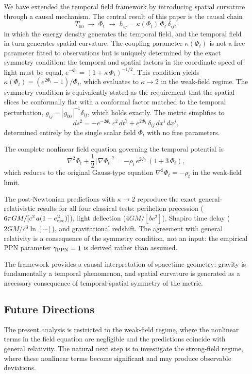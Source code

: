 \documentclass[12pt]{article}
\begin{document}
We have extended the temporal field framework by introducing spatial curvature through a causal mechanism. The central result of this paper is the causal chain
$$
T_{00} \;\longrightarrow\; \Phi_t \;\longrightarrow\; h_{ij} = \kappa(\Phi_t)\,\Phi_t\,\delta_{ij},
$$
in which the energy density generates the temporal field, and the temporal field in turn generates spatial curvature. The coupling parameter $\kappa(\Phi_t)$ is not a free parameter fitted to observations but is uniquely determined by the exact symmetry condition: the temporal and spatial factors in the coordinate speed of light must be equal, $e^{-\Phi_t} = (1+\kappa\,\Phi_t)^{-1/2}$. This condition yields $\kappa(\Phi_t) = (e^{2\Phi_t}-1)/\Phi_t$, which evaluates to $\kappa \to 2$ in the weak-field regime. The symmetry condition is equivalently stated as the requirement that the spatial slices be conformally flat with a conformal factor matched to the temporal perturbation, $g_{ij} = |g_{00}|^{-1}\delta_{ij}$, which holds exactly. The metric simplifies to
$$
ds^2 = -e^{-2\Phi_t}\,c^2\,dt^2 + e^{2\Phi_t}\,\delta_{ij}\,dx^i\,dx^j,
$$
determined entirely by the single scalar field $\Phi_t$ with no free parameters.

The complete nonlinear field equation governing the temporal potential is
$$
\nabla^2\Phi_t + \frac{1}{2}\,|\nabla\Phi_t|^2 = -\rho_t\,e^{2\Phi_t}\,(1 + 3\,\Phi_t),
$$
which reduces to the original Gauss-type equation $\nabla^2\Phi_t = -\rho_t$ in the weak-field limit.

The post-Newtonian predictions with $\kappa \to 2$ reproduce the exact general-relativistic results for all four classical tests: perihelion precession ($6\pi GM/[c^2\,a(1-e_{\rm ecc}^2)]$), light deflection ($4GM/[bc^2]$), Shapiro time delay ($2GM/c^3\ln[\cdots]$), and gravitational redshift. The agreement with general relativity is a consequence of the symmetry condition, not an input: the empirical PPN parameter $\gamma_{\rm PPN} = 1$ is derived rather than assumed.

The framework provides a causal interpretation of spacetime geometry: gravity is fundamentally a temporal phenomenon, and spatial curvature is generated as a necessary consequence of temporal-spatial symmetry of the metric.

\subsection{Future Directions}
\label{sec:future}

The present analysis is restricted to the weak-field regime, where the nonlinear terms in the field equation are negligible and the predictions coincide with general relativity. The natural next step is to investigate the strong-field regime, where these nonlinear terms become significant and may produce observable deviations.
\end{document}
